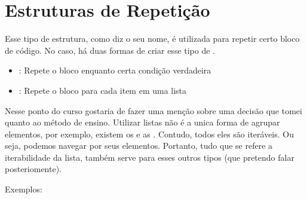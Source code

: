 \documentclass[letterpaper,10pt,english]{jupyterBook}
\begin{document}
\begin{sphinxVerbatim}[commandchars=\\\{\}]
[0, 4, 2, 6]
\end{sphinxVerbatim}

\begin{sphinxVerbatim}[commandchars=\\\{\}]
\end{sphinxVerbatim}

\begin{sphinxVerbatim}[commandchars=\\\{\}]
[]
\end{sphinxVerbatim}


\section{Estruturas de Repetição}
\label{\detokenize{chapters/2:estruturas-de-repeticao}}
\sphinxAtStartPar
Esse tipo de estrutura, como diz o seu nome, é utilizada para repetir certo bloco de código. No caso, há duas formas de criar esse tipo de .
\begin{itemize}
\item {} 
\sphinxAtStartPar
{}: Repete o bloco enquanto certa condição verdadeira

\item {} 
\sphinxAtStartPar
{}: Repete o bloco para cada item em uma lista

\end{itemize}

\sphinxAtStartPar
Nesse ponto do curso gostaria de fazer uma menção sobre uma decisão que tomei quanto ao método de ensino. Utilizar listas não é a unica forma de agrupar elementos, por exemplo, existem os  e as . Contudo, todos eles são iteráveis. Ou seja, podemos navegar por seus elementos. Portanto, tudo que se refere a iterabilidade da lista, também serve para esses outros tipos (que pretendo falar posteriomente).

\sphinxAtStartPar
Exemplos:

\begin{sphinxVerbatim}[commandchars=\\\{\}]
  
    
      
\end{sphinxVerbatim}
\end{document}

